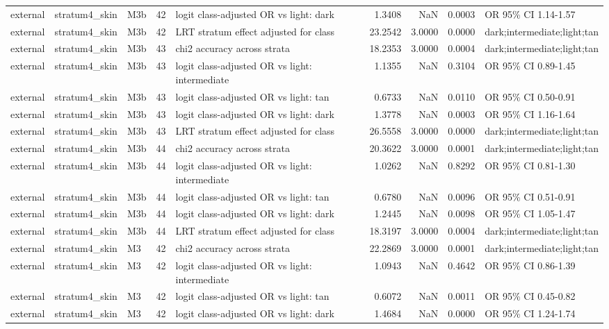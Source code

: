\begin{tabular}{lllrlrrrl}
external & stratum4\_skin & M3b & 42 & logit class-adjusted OR vs light: dark & 1.3408 & NaN & 0.0003 & OR 95\% CI 1.14-1.57 \\
external & stratum4\_skin & M3b & 42 & LRT stratum effect adjusted for class & 23.2542 & 3.0000 & 0.0000 & dark;intermediate;light;tan \\
external & stratum4\_skin & M3b & 43 & chi2 accuracy across strata & 18.2353 & 3.0000 & 0.0004 & dark;intermediate;light;tan \\
external & stratum4\_skin & M3b & 43 & logit class-adjusted OR vs light: intermediate & 1.1355 & NaN & 0.3104 & OR 95\% CI 0.89-1.45 \\
external & stratum4\_skin & M3b & 43 & logit class-adjusted OR vs light: tan & 0.6733 & NaN & 0.0110 & OR 95\% CI 0.50-0.91 \\
external & stratum4\_skin & M3b & 43 & logit class-adjusted OR vs light: dark & 1.3778 & NaN & 0.0003 & OR 95\% CI 1.16-1.64 \\
external & stratum4\_skin & M3b & 43 & LRT stratum effect adjusted for class & 26.5558 & 3.0000 & 0.0000 & dark;intermediate;light;tan \\
external & stratum4\_skin & M3b & 44 & chi2 accuracy across strata & 20.3622 & 3.0000 & 0.0001 & dark;intermediate;light;tan \\
external & stratum4\_skin & M3b & 44 & logit class-adjusted OR vs light: intermediate & 1.0262 & NaN & 0.8292 & OR 95\% CI 0.81-1.30 \\
external & stratum4\_skin & M3b & 44 & logit class-adjusted OR vs light: tan & 0.6780 & NaN & 0.0096 & OR 95\% CI 0.51-0.91 \\
external & stratum4\_skin & M3b & 44 & logit class-adjusted OR vs light: dark & 1.2445 & NaN & 0.0098 & OR 95\% CI 1.05-1.47 \\
external & stratum4\_skin & M3b & 44 & LRT stratum effect adjusted for class & 18.3197 & 3.0000 & 0.0004 & dark;intermediate;light;tan \\
external & stratum4\_skin & M3 & 42 & chi2 accuracy across strata & 22.2869 & 3.0000 & 0.0001 & dark;intermediate;light;tan \\
external & stratum4\_skin & M3 & 42 & logit class-adjusted OR vs light: intermediate & 1.0943 & NaN & 0.4642 & OR 95\% CI 0.86-1.39 \\
external & stratum4\_skin & M3 & 42 & logit class-adjusted OR vs light: tan & 0.6072 & NaN & 0.0011 & OR 95\% CI 0.45-0.82 \\
external & stratum4\_skin & M3 & 42 & logit class-adjusted OR vs light: dark & 1.4684 & NaN & 0.0000 & OR 95\% CI 1.24-1.74 \\

\end{tabular}
